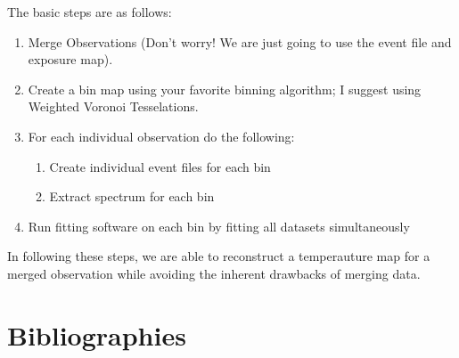 \documentclass[11pt,letterpaper]{article}
\begin{document}
The basic steps are as follows:
\begin{enumerate}
	\item Merge Observations (Don't worry! We are just going to use the event file and exposure map).
	\item Create a bin map using your favorite binning algorithm; I suggest using Weighted Voronoi Tesselations.
	\item For each individual observation do the following:
	\begin{enumerate}
		\item Create individual event files for each bin
		\item Extract spectrum for each bin
	\end{enumerate}
	\item Run fitting software on each bin by fitting all datasets simultaneously
\end{enumerate}

In following these steps, we are able to reconstruct a temperauture map for a merged observation while avoiding the inherent drawbacks of merging data.

\newpage

\section*{Bibliographies}


\end{document}
